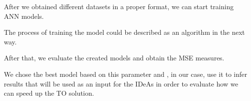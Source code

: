 After we obtained different datasets in a proper format, we can start training ANN models.

The process of training the model could be described as an algorithm in the next way.


After that, we evaluate the created models and obtain the MSE measures.

We chose the best model based on this parameter and , in our case, use it to infer results that will be used as an input for the IDeAs in order to evaluate how we can speed up the TO solution. 
